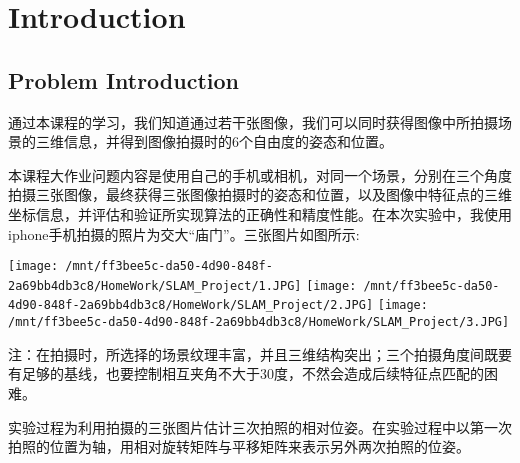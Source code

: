 \chapter{Introduction}
\label{chap:introduction}

\section{Problem Introduction}
通过本课程的学习，我们知道通过若干张图像，我们可以同时获得图像中所拍摄场景的三维信息，并得到图像拍摄时的6个自由度的姿态和位置。

本课程大作业问题内容是使用自己的手机或相机，对同一个场景，分别在三个角度拍摄三张图像，最终获得三张图像拍摄时的姿态和位置，以及图像中特征点的三维坐标信息，并评估和验证所实现算法的正确性和精度性能。在本次实验中，我使用iphone手机拍摄的照片为交大“庙门”。三张图片如图所示:

\texttt{[image: /mnt/ff3bee5c-da50-4d90-848f-2a69bb4db3c8/HomeWork/SLAM\_Project/1.JPG]}
\texttt{[image: /mnt/ff3bee5c-da50-4d90-848f-2a69bb4db3c8/HomeWork/SLAM\_Project/2.JPG]}
\texttt{[image: /mnt/ff3bee5c-da50-4d90-848f-2a69bb4db3c8/HomeWork/SLAM\_Project/3.JPG]}

注：在拍摄时，所选择的场景纹理丰富，并且三维结构突出；三个拍摄角度间既要有足够的基线，也要控制相互夹角不大于30度，不然会造成后续特征点匹配的困难。

实验过程为利用拍摄的三张图片估计三次拍照的相对位姿。在实验过程中以第一次拍照的位置为轴，用相对旋转矩阵与平移矩阵来表示另外两次拍照的位姿。

